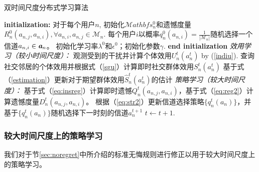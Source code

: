 \begin{algorithm}
\caption{双时间尺度分布式学习算法}
\label{alg:RCS}
\begin{algorithmic}[1]
\STATE \textbf{initialization:} 对于每个用户$n$,
\STATE 初始化$\mathcal{M}athbf{s^0_n}$和遗憾度量$R_n^0(a_{n,j},a_{n,i}), \forall a_{n,i}, a_{n,j}\in\mathcal{M}_n$.
\STATE 每个用户$i$以概率$q^0_n(a_{n,i})=\frac{1}{|\mathcal{M}_n|}$随机选择一个信道$a_{n,i}\in\emph{\textbf{a}}_n$。
\STATE 初始化学习率$\lambda^0$和$\epsilon^0$；初始化参数$\gamma$.
\STATE \textbf{end initialization}
\STATE \emph{效用学习（较小时间尺度）：}
\STATE 观测受到的干扰并计算个体效用$U_n^t(a^t_n)$ by (\ref{indiu}).
\STATE 查询社交邻居的个体效用并根据式（\ref{sgu}）计算即时社交群体效用$S_{n}^t(a^t_n)$
\STATE 基于式（\ref{estimation}）更新对于期望群体效用$\hat{S}_{n}^t(a^t_n)$的估计
\STATE \emph{策略学习（较大时间尺度）：}
\STATE 基于式（\ref{eq:insreg}）计算即时遗憾$Q^t_n(a_{n,j},a_{n,i})$，基于式（\ref{eq:reg2}）计算遗憾度量$D^t_n(a_{n,j},a_{n,i})$。
\STATE 根据（\ref{eq:str2}）更新信道选择策略$\{q^t_n(a_n)\}$，并基于$\{q^t_n(a_n)\}$随机选择下一时刻的信道$a^{t+1}_n$
\STATE $t\leftarrow t+1$.
\ENDFOR
\end{algorithmic}
\end{algorithm}

\subsubsection{较大时间尺度上的策略学习}\label{sec:single}
我们对于节\ref{sec:noregret}中所介绍的标准无悔规则进行修正以用于较大时间尺度上的策略学习。

